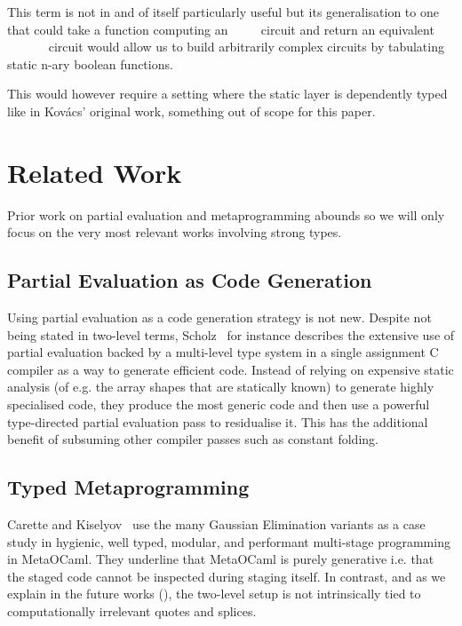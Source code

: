 This term is not in and of itself particularly useful but its
generalisation to one that could take a function computing an
{~~~~} circuit and return an
equivalent {~~\AF{+}~~~~}
circuit would allow us to build arbitrarily complex circuits
by tabulating static n-ary boolean functions.

This would however require a setting where the static layer is
dependently typed like in Kov{\'{a}}cs' original work, something
out of scope for this paper.

\section{Related Work}

Prior work on partial evaluation and metaprogramming
abounds so we will only focus on the very most relevant
works involving strong types.

\subsection{Partial Evaluation as Code Generation}

Using partial evaluation as a code generation strategy
is not new. Despite not being stated in two-level terms,
Scholz~\cite{DBLP:conf/pepm/Scholz14} for instance
describes the extensive use of partial evaluation backed
by a multi-level type system in a single assignment C
compiler as a way to generate efficient code.
%
Instead of relying on expensive static analysis (of e.g.
the array shapes that are statically known) to generate
highly specialised code, they produce the most generic
code and then use a powerful type-directed partial
evaluation pass to residualise it.
%
This has the additional benefit of subsuming other
compiler passes such as constant folding.

\subsection{Typed Metaprogramming}

Carette and Kiselyov~\cite{DBLP:journals/scp/CaretteK11}
use the many Gaussian Elimination variants as a case study
in hygienic, well typed, modular, and performant multi-stage
programming in MetaOCaml.
%
They underline that MetaOCaml is purely generative i.e.
that the staged code cannot be inspected during staging
itself.
%
In contrast, and as we explain in the future works
(), the two-level setup is not
intrinsically tied to computationally irrelevant quotes
and splices.

